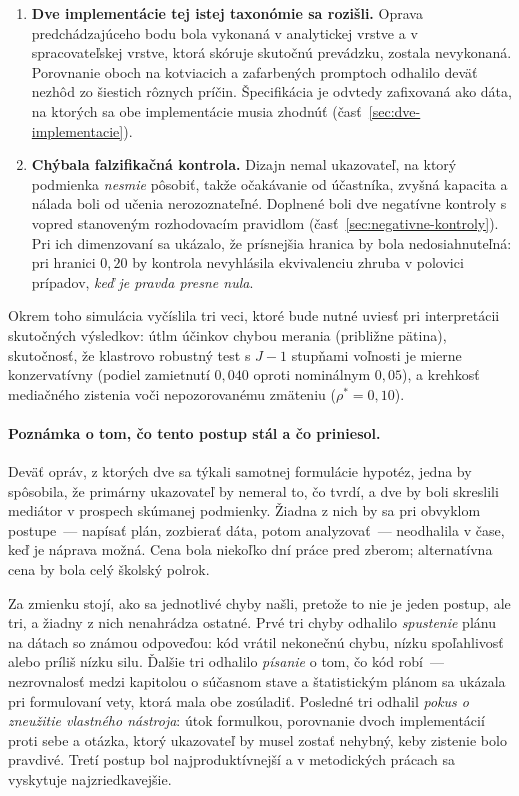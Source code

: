 \begin{enumerate}[nosep]
    \item \textbf{Dve implementácie tej istej taxonómie sa rozišli.} Oprava predchádzajúceho bodu bola vykonaná v analytickej vrstve a v spracovateľskej vrstve, ktorá skóruje skutočnú prevádzku, zostala nevykonaná. Porovnanie oboch na \venN{} kotviacich a zafarbených promptoch odhalilo deväť nezhôd zo šiestich rôznych príčin. Špecifikácia je odvtedy zafixovaná ako dáta, na ktorých sa obe implementácie musia zhodnúť (časť~\ref{sec:dve-implementacie}).
    \item \textbf{Chýbala falzifikačná kontrola.} Dizajn nemal ukazovateľ, na ktorý podmienka \emph{nesmie} pôsobiť, takže očakávanie od účastníka, zvyšná kapacita a nálada boli od učenia nerozoznateľné. Doplnené boli dve negatívne kontroly s vopred stanoveným rozhodovacím pravidlom (časť~\ref{sec:negativne-kontroly}). Pri ich dimenzovaní sa ukázalo, že prísnejšia hranica by bola nedosiahnuteľná: pri hranici $0{,}20$ by kontrola nevyhlásila ekvivalenciu zhruba v polovici prípadov, \emph{keď je pravda presne nula}.
\end{enumerate}

Okrem toho simulácia vyčíslila tri veci, ktoré bude nutné uviesť pri interpretácii skutočných výsledkov: útlm účinkov chybou merania (približne pätina), skutočnosť, že klastrovo robustný test s $J-1$ stupňami voľnosti je mierne konzervatívny (podiel zamietnutí $0{,}040$ oproti nominálnym $0{,}05$), a krehkosť mediačného zistenia voči nepozorovanému zmäteniu ($\rho^\ast = 0{,}10$).

\paragraph{Poznámka o tom, čo tento postup stál a čo priniesol.} Deväť opráv, z ktorých dve sa týkali samotnej formulácie hypotéz, jedna by spôsobila, že primárny ukazovateľ by nemeral to, čo tvrdí, a dve by boli skreslili mediátor v prospech skúmanej podmienky. Žiadna z nich by sa pri obvyklom postupe~--- napísať plán, zozbierať dáta, potom analyzovať~--- neodhalila v čase, keď je náprava možná. Cena bola niekoľko dní práce pred zberom; alternatívna cena by bola celý školský polrok.

Za zmienku stojí, ako sa jednotlivé chyby našli, pretože to nie je jeden postup, ale tri, a žiadny z nich nenahrádza ostatné. Prvé tri chyby odhalilo \emph{spustenie} plánu na dátach so známou odpoveďou: kód vrátil nekonečnú chybu, nízku spoľahlivosť alebo príliš nízku silu. Ďalšie tri odhalilo \emph{písanie} o tom, čo kód robí~--- nezrovnalosť medzi kapitolou o súčasnom stave a štatistickým plánom sa ukázala pri formulovaní vety, ktorá mala obe zosúladiť. Posledné tri odhalil \emph{pokus o zneužitie vlastného nástroja}: útok formulkou, porovnanie dvoch implementácií proti sebe a otázka, ktorý ukazovateľ by musel zostať nehybný, keby zistenie bolo pravdivé. Tretí postup bol najproduktívnejší a v metodických prácach sa vyskytuje najzriedkavejšie.

